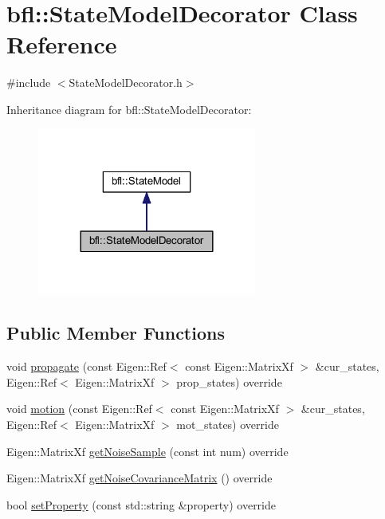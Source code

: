 \hypertarget{classbfl_1_1StateModelDecorator}{}\section{bfl\+:\+:State\+Model\+Decorator Class Reference}
\label{classbfl_1_1StateModelDecorator}


{\ttfamily \#include $<$State\+Model\+Decorator.\+h$>$}



Inheritance diagram for bfl\+:\+:State\+Model\+Decorator\+:
\nopagebreak
\begin{figure}[H]
\begin{center}
\leavevmode
\includegraphics[width=204pt]{classbfl_1_1StateModelDecorator__inherit__graph}
\end{center}
\end{figure}
\subsection*{Public Member Functions}
\begin{DoxyCompactItemize}
\item 
void \mbox{\hyperlink{classbfl_1_1StateModelDecorator_a3780afac5fc0e542cf4517c2057f9957}{propagate}} (const Eigen\+::\+Ref$<$ const Eigen\+::\+Matrix\+Xf $>$ \&cur\+\_\+states, Eigen\+::\+Ref$<$ Eigen\+::\+Matrix\+Xf $>$ prop\+\_\+states) override
\item 
void \mbox{\hyperlink{classbfl_1_1StateModelDecorator_a0a645d8be4085ec13d9715a41c84a9b3}{motion}} (const Eigen\+::\+Ref$<$ const Eigen\+::\+Matrix\+Xf $>$ \&cur\+\_\+states, Eigen\+::\+Ref$<$ Eigen\+::\+Matrix\+Xf $>$ mot\+\_\+states) override
\item 
Eigen\+::\+Matrix\+Xf \mbox{\hyperlink{classbfl_1_1StateModelDecorator_a3e29bad844203ffc3fe0c2bc445377e5}{get\+Noise\+Sample}} (const int num) override
\item 
Eigen\+::\+Matrix\+Xf \mbox{\hyperlink{classbfl_1_1StateModelDecorator_a1c64652f48c9463a2fa9b9e85d5ef0cf}{get\+Noise\+Covariance\+Matrix}} () override
\item 
bool \mbox{\hyperlink{classbfl_1_1StateModelDecorator_ad292f3b665c1adf20a1f32dc8a065fec}{set\+Property}} (const std\+::string \&property) override
\end{DoxyCompactItemize}
